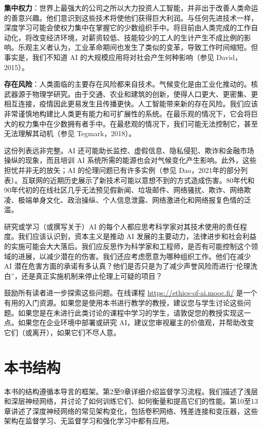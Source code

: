 \documentclass[lang=cn,newtx,10pt,scheme=chinese]{elegantbook}
\begin{document}
\textbf{集中权力}：世界上最强大的公司之所以大力投资人工智能，并非出于改善人类命运的善意兴趣。他们意识到这些技术将使他们获得巨大利润。与任何先进技术一样，深度学习可能会使权力集中在掌握它的少数组织手中。将目前由人类完成的工作自动化，将改变经济环境，对薪资较低、技能较少的工人的生计产生不成比例的影响。乐观主义者认为，工业革命期间也发生了类似的变革，导致工作时间缩短。但事实是，我们不知道 AI 的大规模应用将对社会产生何种影响（参见 David，2015）。

\textbf{存在风险}：人类面临的主要存在风险都来自技术。气候变化是由工业化推动的。核武器源于物理学研究。由于交通、农业和建筑的创新，使得人口更大、更密集、更相互连接，疫情因此更易发生且传播更快。人工智能带来新的存在风险。我们应该非常谨慎地构建比人类更有能力和可扩展性的系统。在最乐观的情况下，它会将巨大的权力集中在少数拥有者手中。在最悲观的情况下，我们可能无法控制它，甚至无法理解其动机（参见 Tegmark，2018）。

这份列表远非完整。AI 还可能助长监控、虚假信息、隐私侵犯、欺诈和金融市场操纵的现象，而且培训 AI 系统所需的能源也会对气候变化产生影响。此外，这些担忧并非无的放矢；AI 的伦理问题已有许多实例（参见 Dao，2021年的部分列表）。互联网的近期历史展示了新技术可能以意想不到的方式造成伤害。80年代和90年代初的在线社区几乎无法预见假新闻、垃圾邮件、网络骚扰、欺诈、网络欺凌、极端单身文化、政治操纵、个人信息泄露、网络激进化和网络报复色情的泛滥。

研究或学习（或撰写关于）AI 的每个人都应思考科学家对其技术使用的责任程度。我们应该认识到，资本主义是推动 AI 发展的主要动力，法律进步和社会利益的实施可能会大大落后。我们应反思作为科学家和工程师，是否有可能控制这个领域的进展，以减少潜在的伤害。我们还应考虑愿意为哪种组织工作。他们在减少 AI 潜在危害方面的承诺有多认真？他们是否只是为了减少声誉风险而进行“伦理洗白”，还是真正实施机制来停止伦理上可疑的项目？

鼓励所有读者进一步探索这些问题。在线课程 \url{https://ethics-of-ai.mooc.fi/} 是一个有用的入门资源。如果您是使用本书进行教学的教授，建议您与学生讨论这些问题。如果您是在未进行此类讨论的课程中学习的学生，请敦促您的教授实现这一点。如果您在企业环境中部署或研究 AI，建议您审视雇主的价值观，并帮助改变它们（或离开），如果它们不尽人意。

\section{本书结构}

本书的结构遵循本导言的框架。第2至9章详细介绍监督学习流程。我们描述了浅层和深层神经网络，并讨论了如何训练它们、如何衡量和提高它们的性能。第10至13章讲述了深度神经网络的常见架构变化，包括卷积网络、残差连接和变压器，这些架构在监督学习、无监督学习和强化学习中都有应用。
\end{document}

